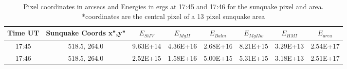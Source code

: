 \begin{table}[H]
\centering
\begin{tabular}{|c|c|c|c|c|c|c|c|}
Time UT & Sunquake Coords x",y"  & $E_{Si IV}$ & $E_{Mg II}$ & $E_{Balm}$ & $E_{Mg II w}$ & $E_{HMI}$ & $E_{area}$\\
\hline
17:45 & 518.5, 264.0 & 9.63E+14 & 4.36E+16 & 2.68E+16 & 8.21E+15 & 3.29E+13 & 2.54E+17\\
17:46 & 518.5, 264.0 & 2.52E+15 & 1.58E+16 & 5.00E+15 & 5.31E+15 & 3.18E+13 & 2.51E+17\\
\end{tabular}
\caption{Pixel coordinates in arcsecs and Energies in ergs at 17:45 and 17:46 for the sunquake pixel and area. *coordinates are the central pixel of a 13 pixel sunquake area}\label{qkenergytab}
\end{table}


